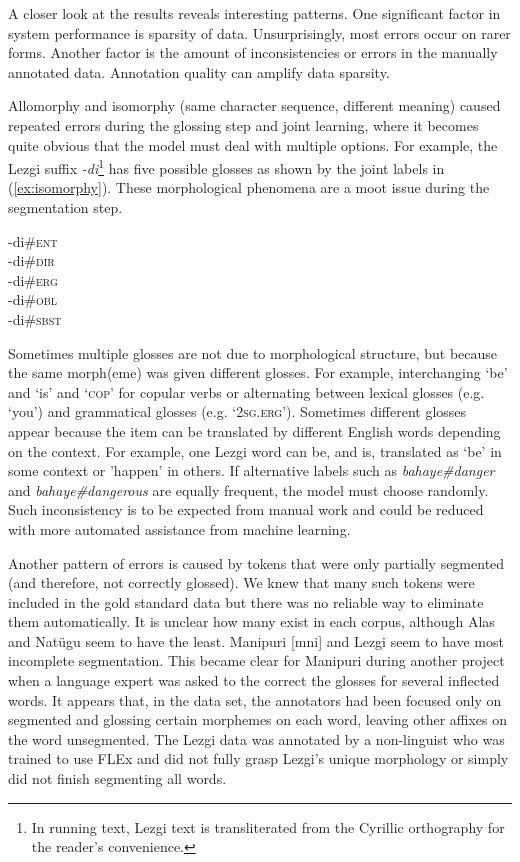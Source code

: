 A closer look at the results reveals interesting patterns. One significant factor in system performance is sparsity of data. Unsurprisingly, most errors occur on rarer forms. 
Another factor is the amount of inconsistencies or errors in the manually annotated data. Annotation quality can amplify data sparsity. 

Allomorphy and isomorphy (same character sequence, different meaning) caused repeated errors during the glossing step and joint learning, where it becomes quite obvious that the model must deal with multiple options. For example, the Lezgi suffix \textit{-di}\footnote{In running text, Lezgi text is transliterated from the Cyrillic orthography for the reader's convenience.} has five possible glosses as shown by the joint labels in (\ref{ex:isomorphy}). These morphological phenomena are a moot issue during the segmentation step. 

\pex   
\label{ex:isomorphy}
-di\#\textsc{ent} \\
-di\#\textsc{dir} \\
-di\#\textsc{erg} \\
-di\#\textsc{obl} \\
-di\#\textsc{sbst} 
\xe

Sometimes multiple glosses are not due to morphological structure, but because the same morph(eme) was given different glosses. For example, interchanging `be' and `is' and `\textsc{cop}' for copular verbs or alternating between lexical glosses (e.g. `you') and grammatical glosses (e.g. `\textsc{2sg.erg}'). Sometimes different glosses appear because the item can be translated by different English words depending on the context. For example, one Lezgi word can be, and is, translated as `be' in some context or 'happen' in others. If alternative labels such as \textit{bahaye\#danger} and \textit{bahaye\#dangerous} are equally frequent, the model must choose randomly. Such inconsistency is to be expected from manual work and could be reduced with more automated assistance from machine learning.

Another pattern of errors is caused by tokens that were only partially segmented (and therefore, not correctly glossed). We knew that many such tokens were included in the gold standard data but there was no reliable way to eliminate them automatically. It is unclear how many exist in each corpus, although Alas and Nat\"ugu seem to have the least. Manipuri [mni] and Lezgi seem to have most incomplete segmentation. This became clear for Manipuri during another project when a language expert was asked to the correct the glosses for several inflected words. It appears that, in the data set, the annotators had been focused only on segmented and glossing certain morphemes on each word, leaving other affixes on the word unsegmented. 
The Lezgi data was annotated by a non-linguist who was trained to use FLEx and did not fully grasp Lezgi's unique morphology or simply did not finish segmenting all words. 

